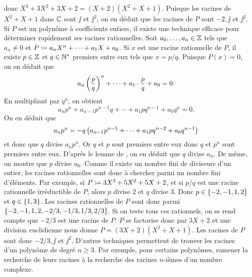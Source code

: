 \documentclass{magnolia}
\begin{document}
\begin{remarques}
\noindent donc $X^3+3X^2+3X+2=(X+2)(X^2+X+1)$. Puisque les racines de $X^2+X+1$ dans $\mathbb{C}$ sont $\jj$ et
$\jj^2$, on en déduit que les racines de $P$ sont $-2,\jj$ et $\jj^2$.
\remarque
Si $P$ est un polynôme à coefficients entiers, il existe une technique efficace pour déterminer rapidement
ses racines rationnelles. Soit $a_0,\ldots,a_n\in\mathbb{Z}$ tels que $a_n\neq 0$ et $P\coloneqq a_n X^n+\cdots+a_1 X+a_0$.
Si $x$ est une racine rationnelle de $P$, il existe $p\in\mathbb{Z}$ et $q\in{\mathbb{N}^*}$ premiers entre eux tels que
$x=p/q$. Puisque $P(x)=0$, on en déduit que
\[a_n\left(\frac{p}{q}\right)^n+\cdots+a_1\cdot\frac{p}{q}+a_0=0.\]
En multipliant par $q^n$, on obtient
\[a_n p^n + a_{n-1}p^{n-1}q+\cdots+a_1 p q^{n-1}+a_0 q^n=0.\]
On en déduit que
\[a_n p^n = -q\left(a_{n-1}p^{n-1}+\cdots+a_1 p q^{n-2}+a_0 q^{n-1}\right)\]
et donc que $q$ divise $a_n p^n$. Or $q$ et $p$ sont premiers entre eux donc $q$ et $p^n$ sont premiers entre eux. D'après le lemme de , on en déduit que $q$ divise $a_n$. De même, on montre que $p$ divise $a_0$. Comme il existe un nombre fini de diviseurs d'un entier, les racines rationnelles sont donc à chercher parmi un nombre fini d'éléments. Par exemple, si $P\coloneqq 3X^3+5X^2+5X+2$, et si $p/q$ est une racine rationnelle irréductible de $P$, alors $p$ divise 2 et $q$ divise 3. Donc $p\in\left\{-2,-1,1,2\right\}$ et $q\in\left\{1, 3\right\}$. Les racines rationnelles de $P$ sont donc parmi $\left\{-2,-1,1,2,-2/3,-1/3,1/3,2/3\right\}$. Si on teste tous ces rationnels, on se rend compte que $-2/3$ est une racine de $P$. $P$ se factorise donc par $3X+2$ et une division euclidienne nous donne $P=(3X+2)(X^2+X+1)$. Les racines de $P$ sont donc $-2/3,\jj$ et $\jj^2$.
\remarque D'autres techniques permettent de trouver les racines d'un polynôme de degré $n\geq 3$. Par exemple, pour certains polynômes, ramener la recherche de leurs racines à la recherche des racines $n$-ièmes d'un nombre complexe.
\end{remarques}



\end{document}
